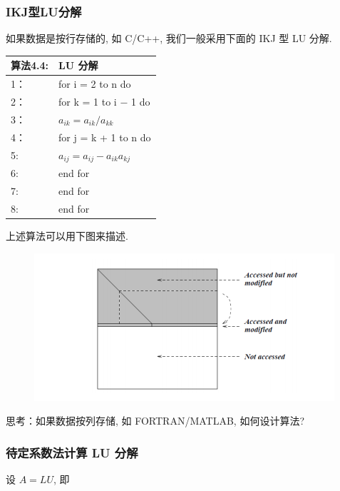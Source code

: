 \documentclass[12pt,a4paper]{article}
\begin{document}
\subsubsection{IKJ型LU分解}
如果数据是按行存储的, 如 C/C++, 我们一般采用下面的 IKJ 型 LU 分解.
\begin{table}  
	\begin{tabular*}{16cm}{ll}  
		\hline  
		算法4.4: & LU 分解 \\  
		\hline  
		1：   &for i = 2 to n do\\  
		2：   &\qquad for k = 1 to i − 1 do\\
		3：   &\qquad \qquad $a_{ik} = a_{ik}/a_{kk}$\\
		4：   &\qquad \qquad for j = k + 1 to n do\\
		5:    &\qquad \qquad \qquad $a_{ij} = a_{ij} − a_{ik}a_{kj}$\\
		6:    &\qquad \qquad end for\\
		7:    &\qquad end for\\
		8:    &end for \\
		\hline  
	\end{tabular*}  
\end{table} 

上述算法可以用下图来描述.

\begin{figure}[h]%
	\centering  %
	\includegraphics[width=0.7\linewidth]{figures/Figure_6.png}  %
	\caption{}  %
	\label{fig:mcmthesis-logo}   %
\end{figure}


思考：如果数据按列存储, 如 FORTRAN/MATLAB, 如何设计算法?	


\subsubsection{待定系数法计算 LU 分解}

设 $A = LU$, 即
\end{document}
